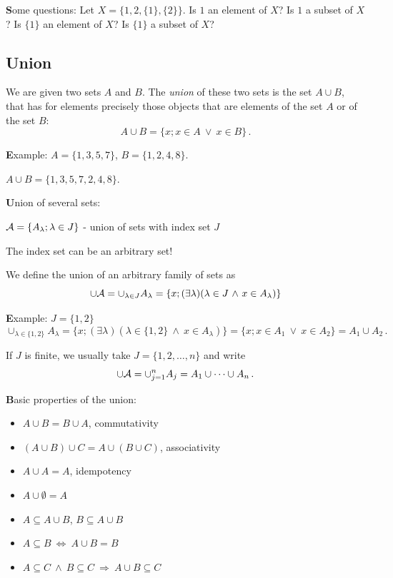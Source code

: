 \documentclass[11pt,paper=b5,footinclude,headinclude]{scrbook} %
\def\ali {{~\vee~}}
\def\inn {{~\wedge~}}
\def\sledi {{~\Rightarrow~}}
\def\cee {{~\Leftrightarrow~}}
\theoremstyle{remark}
\theoremstyle{definition} %
\begin{document}
\medskip

{\textbf Some questions:} Let $X = \{1,2,\{1\},\{2\}\}$.
Is $1$ an element of $X$?
Is $1$ a subset of $X$?
Is $\{1\}$ an element of $X$?
Is $\{1\}$ a subset of $X$?

\bigskip

\subsection{Union}
We are given two sets $A$ and $B$. The {\em union} of these two sets is the set $A\cup B$,
that has for elements precisely those objects that are elements of the set $A$ or of the set $B$:
$$A\cup B = \{x; x\in A \ali x\in B\}\,.$$

{\textbf Example:}
$A = \{1,3,5,7\}$, $B = \{1,2,4,8\}$.

$A\cup B = \{1,3,5,7,2,4,8\}$.

\medskip

{\textbf Union of several sets}:

${\cal A} = \{A_\lambda; \lambda \in J\}$ - union of sets with index set $J$

The index set can be an arbitrary set!

We define the union of an arbitrary family of sets as
$$\cup {\cal A} = \cup_{\lambda \in J} A_\lambda = \{x;(\exists \lambda) (\lambda \in J\inn x\in A_\lambda)\}$$

\medskip
{\textbf Example:} $J = \{1,2\}$
$$\cup_{\lambda \in \{1,2\}} A_\lambda = \{x;(\exists \lambda) (\lambda \in \{1,2\}\inn x\in A_\lambda)\}= \{x;x\in A_1 \ali x\in A_2\} = A_1\cup A_2\,.$$

\medskip
If $J$ is finite, we usually take $J = \{1,2,\ldots, n\}$ and write
$$\cup {\cal A} = \cup_{j = 1}^nA_j = A_1\cup\cdots\cup A_n\,.$$

\bigskip
{\textbf Basic properties of the union:}
\begin{itemize}
  \item $A\cup B = B\cup A$, commutativity
  \item $(A\cup B)\cup C = A\cup (B\cup C)$, associativity
  \item $A\cup A = A$, idempotency
  \item $A\cup \emptyset = A$
  \item $A\subseteq A\cup B$, $B\subseteq A\cup B$
  \item $A\subseteq B\cee A\cup B = B$
  \item $A\subseteq C\inn B\subseteq C\sledi A\cup B \subseteq C$
\end{itemize}
\end{document}
